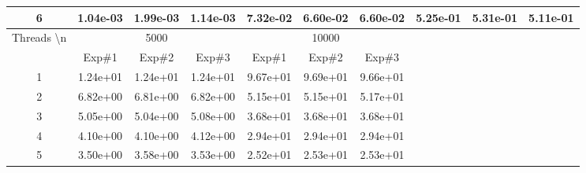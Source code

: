 \begin{table}[]
\begin{adjustbox}{angle=90}
\begin{tabular}{|c|ccc|ccc|ccc}
6                                         & \multicolumn{1}{c|}{1.04e-03} & \multicolumn{1}{c|}{1.99e-03} & 1.14e-03 & \multicolumn{1}{c|}{7.32e-02} & \multicolumn{1}{c|}{6.60e-02} & 6.60e-02 & \multicolumn{1}{c|}{5.25e-01} & \multicolumn{1}{c|}{5.31e-01} & \multicolumn{1}{c|}{5.11e-01} \\ \hline
\multirow{2}{*}{Threads \textbackslash n} & \multicolumn{3}{c|}{5000}                                                & \multicolumn{3}{c|}{10000}                                               &                               &                               &                               \\ \cline{2-7}
                                          & \multicolumn{1}{c|}{Exp\#1}   & \multicolumn{1}{c|}{Exp\#2}   & Exp\#3   & \multicolumn{1}{c|}{Exp\#1}   & \multicolumn{1}{c|}{Exp\#2}   & Exp\#3   & \multicolumn{1}{l}{}          & \multicolumn{1}{l}{}          & \multicolumn{1}{l}{}          \\ \cline{1-7}
1                                         & \multicolumn{1}{c|}{1.24e+01} & \multicolumn{1}{c|}{1.24e+01} & 1.24e+01 & \multicolumn{1}{c|}{9.67e+01} & \multicolumn{1}{c|}{9.69e+01} & 9.66e+01 & \multicolumn{1}{l}{}          & \multicolumn{1}{l}{}          & \multicolumn{1}{l}{}          \\ \cline{1-7}
2                                         & \multicolumn{1}{c|}{6.82e+00} & \multicolumn{1}{c|}{6.81e+00} & 6.82e+00 & \multicolumn{1}{c|}{5.15e+01} & \multicolumn{1}{c|}{5.15e+01} & 5.17e+01 & \multicolumn{1}{l}{}          & \multicolumn{1}{l}{}          & \multicolumn{1}{l}{}          \\ \cline{1-7}
3                                         & \multicolumn{1}{c|}{5.05e+00} & \multicolumn{1}{c|}{5.04e+00} & 5.08e+00 & \multicolumn{1}{c|}{3.68e+01} & \multicolumn{1}{c|}{3.68e+01} & 3.68e+01 & \multicolumn{1}{l}{}          & \multicolumn{1}{l}{}          & \multicolumn{1}{l}{}          \\ \cline{1-7}
4                                         & \multicolumn{1}{c|}{4.10e+00} & \multicolumn{1}{c|}{4.10e+00} & 4.12e+00 & \multicolumn{1}{c|}{2.94e+01} & \multicolumn{1}{c|}{2.94e+01} & 2.94e+01 & \multicolumn{1}{l}{}          & \multicolumn{1}{l}{}          & \multicolumn{1}{l}{}          \\ \cline{1-7}
5                                         & \multicolumn{1}{c|}{3.50e+00} & \multicolumn{1}{c|}{3.58e+00} & 3.53e+00 & \multicolumn{1}{c|}{2.52e+01} & \multicolumn{1}{c|}{2.53e+01} & 2.53e+01 & \multicolumn{1}{l}{}          & \multicolumn{1}{l}{}          & \multicolumn{1}{l}{}          \\ \cline{1-7}

\end{tabular}
\end{adjustbox}
\end{table}
